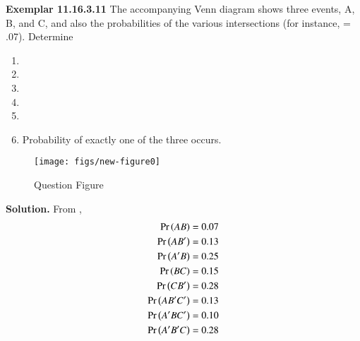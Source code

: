 \documentclass[journal,12pt,twocolumn]{IEEEtran}
\begin{document}
\bigskip
\renewcommand{\thefigure}{\theenumi}
\renewcommand{\thetable}{\theenumi}
\textbf{Exemplar 11.16.3.11}
The accompanying Venn diagram shows three events, A, B, and C, and also the probabilities of the various intersections (for instance,  = .07). Determine
\begin{enumerate}[label=(\alph*)]
\item 
{}
\item 
{}
\item 
{}
\item 
{}
\item 
{}
\item 
Probability of exactly one
of the three occurs.
\end{enumerate}
\begin{enumerate}
\begin{figure}[h!]
\texttt{[image: figs/new-figure0]}
\caption{Question Figure}
\label{fig}
\end{figure}
\end{enumerate}
\textbf{Solution.}
\fi
From 
,
    \begin{align}
        \label{eq:exemplar/11/16/3/11/1}
        \Pr\left(AB\right)=0.07\\
        \label{eq:exemplar/11/16/3/11/2}
        \Pr\left(AB^\prime\right)=0.13\\
        \label{eq:exemplar/11/16/3/11/8}
        \Pr\left(A^\prime B\right) = 0.25\\
        \label{eq:exemplar/11/16/3/11/4}
        \Pr\left(BC\right) = 0.15\\
        \Pr\left(CB^\prime\right) = 0.28\\
        \label{eq:exemplar/11/16/3/11/6}
        \Pr\left(AB^\prime C^\prime\right) = 0.13\\
        \label{eq:exemplar/11/16/3/11/5}
        \Pr\left(A^\prime B C^\prime\right) =0.10\\
        \label{eq:exemplar/11/16/3/11/7}
        \Pr\left(A^\prime B^\prime C\right) =0.28
    \end{align}
\end{document}
